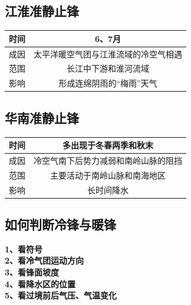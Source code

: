 \documentclass[UTF8]{ctexart}
\begin{document}
    \subsection*{江淮准静止锋}

    \begin{table}[h]
        \begin{center}
            \begin{tabular}{ |c|c| }
                \hline 时间 & 6、7月 \\
                \hline 成因 & 太平洋暖空气团与江淮流域的冷空气相遇 \\
                \hline 范围 & 长江中下游和淮河流域 \\
                \hline 影响 & 形成连绵阴雨的“梅雨”天气 \\
                \hline
            \end{tabular}
        \end{center}
    \end{table}
    
    \newpage

    \subsection*{华南准静止锋}

    \begin{table}[h]
        \begin{center}
            \begin{tabular}{ |c|c| }
                \hline 时间 & 多出现于冬春两季和秋末 \\
                \hline 成因 & 冷空气南下后势力减弱和南岭山脉的阻挡 \\
                \hline 范围 & 主要活动于南岭山脉和南海地区 \\
                \hline 影响 & 长时间降水 \\
                \hline
            \end{tabular}
        \end{center}
    \end{table}

    \subsection*{如何判断冷锋与暖锋}
    \noindent
    \textbf{1、看符号}\\
    \textbf{2、看冷气团运动方向}\\
    \textbf{3、看锋面坡度}\\
    \textbf{4、看降水区的位置}\\
    \textbf{5、看过境前后气压、气温变化}
\end{document}
